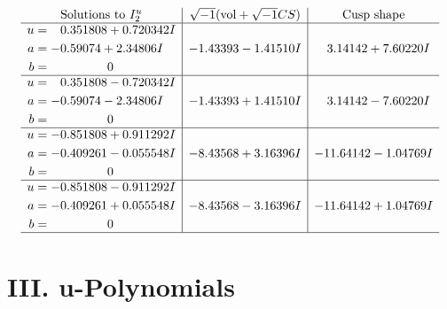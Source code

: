 \documentclass[1p]{elsarticle_modified}
\theoremstyle{definition}
\newcommand{\I}{\sqrt{-1}}
\begin{document}
$$\begin{array}{c|c|c}  
\text{Solutions to }I^u_{2}& \I (\text{vol} + \sqrt{-1}CS) & \text{Cusp shape}\\
 \hline 
\begin{aligned}
u &= \phantom{-}0.351808 + 0.720342 I \\
a &= -0.59074 + 2.34806 I \\
b &= \phantom{-0.000000 } 0\end{aligned}
 & -1.43393 - 1.41510 I & \phantom{-}3.14142 + 7.60220 I \\ \hline\begin{aligned}
u &= \phantom{-}0.351808 - 0.720342 I \\
a &= -0.59074 - 2.34806 I \\
b &= \phantom{-0.000000 } 0\end{aligned}
 & -1.43393 + 1.41510 I & \phantom{-}3.14142 - 7.60220 I \\ \hline\begin{aligned}
u &= -0.851808 + 0.911292 I \\
a &= -0.409261 - 0.055548 I \\
b &= \phantom{-0.000000 } 0\end{aligned}
 & -8.43568 + 3.16396 I & -11.64142 - 1.04769 I \\ \hline\begin{aligned}
u &= -0.851808 - 0.911292 I \\
a &= -0.409261 + 0.055548 I \\
b &= \phantom{-0.000000 } 0\end{aligned}
 & -8.43568 - 3.16396 I & -11.64142 + 1.04769 I\\
 \hline 
 \end{array}$$\newpage
\newpage\renewcommand{\arraystretch}{1}
\centering \section*{ III. u-Polynomials}
\end{document}
